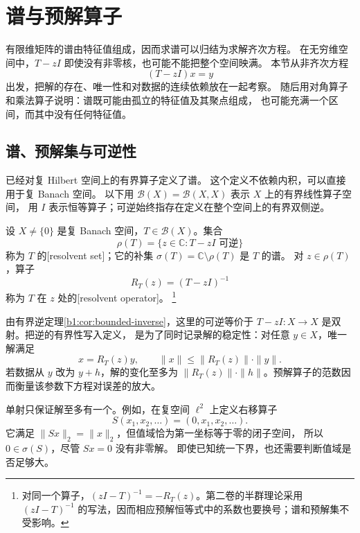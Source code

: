 \section{谱与预解算子}
\label{b1:sec:2901}

有限维矩阵的谱由特征值组成，因而求谱可以归结为求解齐次方程。
在无穷维空间中，\(T-zI\) 即使没有非零核，也可能不能把整个空间映满。
本节从非齐次方程
\[
 (T-zI)x=y
\]
出发，把解的存在、唯一性和对数据的连续依赖放在一起考察。
随后用对角算子和乘法算子说明：谱既可能由孤立的特征值及其聚点组成，
也可能充满一个区间，而其中没有任何特征值。

\subsection{谱、预解集与可逆性}
\label{b1:subsec:290101}

已经对复 Hilbert 空间上的有界算子定义了谱。
这个定义不依赖内积，可以直接用于复 Banach 空间。
以下用 \(\mathcal B(X)=\mathcal B(X,X)\) 表示 \(X\) 上的有界线性算子空间，
用 \(I\) 表示恒等算子；可逆始终指存在定义在整个空间上的有界双侧逆。

\begin{definition}[预解集与预解算子]
\label{b1:def:29-resolvent}
设 \(X\ne\{0\}\) 是复 Banach 空间，\(T\in\mathcal B(X)\)。集合
\[
 \rho(T)=\{z\in\mathbb C:T-zI\text{ 可逆}\}
\]
称为 \(T\) 的[resolvent set]；它的补集
\(\sigma(T)=\mathbb C\setminus\rho(T)\) 是 \(T\) 的谱。
对 \(z\in\rho(T)\)，算子
\[
 R_T(z)=(T-zI)^{-1}
\]
称为 \(T\) 在 \(z\) 处的[resolvent operator]。
\footnote{对同一个算子，\((zI-T)^{-1}=-R_T(z)\)。第二卷的半群理论采用
\((zI-T)^{-1}\) 的写法，因而相应预解恒等式中的系数也要换号；谱和预解集不受影响。}
\end{definition}

由有界逆定理\cref{b1:cor:bounded-inverse}，这里的可逆等价于
\(T-zI:X\to X\) 是双射。把逆的有界性写入定义，
是为了同时记录解的稳定性：对任意 \(y\in X\)，唯一解满足
\[
 x=R_T(z)y,\qquad \|x\|\leq\|R_T(z)\|\cdot\|y\|.
\]
若数据从 \(y\) 改为 \(y+h\)，解的变化至多为
\(\|R_T(z)\|\cdot\|h\|\)。预解算子的范数因而衡量该参数下方程对误差的放大。

\ProseParagraphBreak

单射只保证解至多有一个。例如，在复空间 \(\ell^2\) 上定义右移算子
\[
 S(x_1,x_2,\ldots)=(0,x_1,x_2,\ldots).
\]
它满足 \(\|Sx\|_2=\|x\|_2\)，但值域恰为第一坐标等于零的闭子空间，
所以 \(0\in\sigma(S)\)，尽管 \(Sx=0\) 没有非零解。
即使已知统一下界，也还需要判断值域是否足够大。

